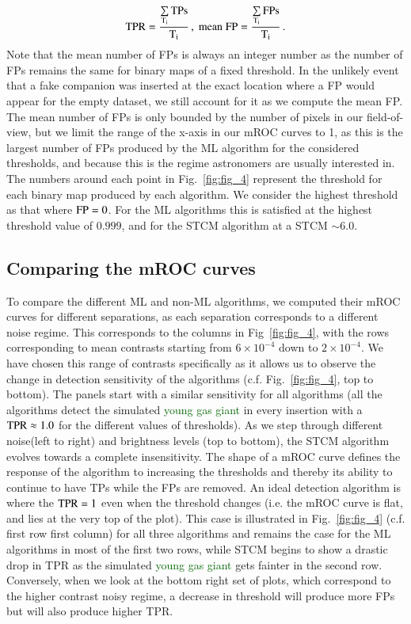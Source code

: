 \documentclass{aa}
\newcommand{\newchange}[1]{\textcolor{darkgreen}{#1}}
\begin{document}
\begin{equation}
\rm{TPR} =\dfrac{\sum\limits_{T_i}\rm{TPs}}{T_i} \, , \; 
\rm{mean\; FP} = \dfrac{\sum\limits_{T_i}FPs}{T_i} \, .
\label{eq:TPR}
\end{equation}
Note that the mean number of FPs is always an integer number as the number of FPs remains the same for binary maps of a fixed threshold.
In the unlikely event that a fake companion was inserted at the exact location where a FP would appear for the empty dataset, we still account for it as we compute the mean FP. The mean number of FPs is only bounded by the number of pixels in our field-of-view, but we limit the range of the x-axis in our mROC curves to 1, as this is the largest number of FPs produced by the ML algorithm for the considered thresholds, and because this is the regime astronomers are usually interested in.
The numbers around each point in Fig.~\ref{fig:fig_4} represent the threshold for each binary map produced by each algorithm.
We consider the highest threshold as that where ${\rm FP} = 0$.
For the ML algorithms this is satisfied at the highest threshold value of $0.999$, and for the STCM algorithm at a STCM $\sim 6.0$. 


\subsection{Comparing the mROC curves}
\label{sec:roc}

To compare the different ML and non-ML algorithms, we computed their mROC curves for different separations, as each separation corresponds to a different noise regime.
This corresponds to the columns in Fig~\ref{fig:fig_4}, with the rows corresponding to mean contrasts starting from $6\times10^{-4}$ down to $2\times10^{-4}$.
We have chosen this range of contrasts specifically as it allows us to observe the change in detection sensitivity of the algorithms (c.f. Fig.~\ref{fig:fig_4}, top to bottom). The panels start with a similar sensitivity for all algorithms (all the algorithms detect the simulated \newchange{young gas giant} in every insertion with a ${\rm TPR}\approx 1.0$ for the different values of thresholds). 
As we step through different noise(left to right) and brightness levels (top to bottom), the STCM algorithm evolves towards a complete insensitivity.
The shape of a mROC curve defines the response of the algorithm to increasing the thresholds and thereby its ability to continue to have TPs while the FPs are removed.
An ideal detection algorithm is where the ${\rm TPR}=1$ even when the threshold changes (i.e. the mROC curve is flat, and lies at the very top of the plot).
This case is illustrated in Fig.~\ref{fig:fig_4}  (c.f. first row first column) for all three algorithms and remains the case for the ML algorithms in most of the first two rows, while STCM begins to show a drastic drop in TPR as the simulated \newchange{young gas giant} gets fainter in the second row.
Conversely, when we look at the bottom right set of plots, which correspond to the higher contrast noisy regime, a decrease in threshold will produce more FPs but will also produce higher TPR. 
\end{document}
